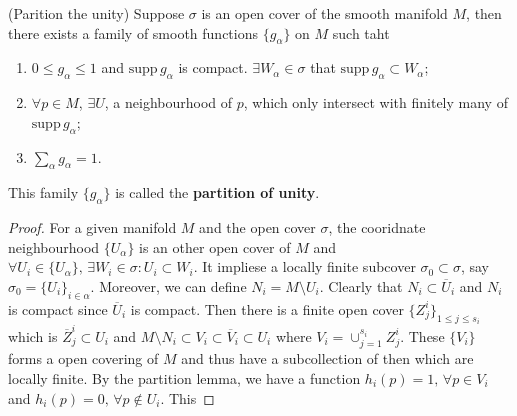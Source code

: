 \begin{theorem}(Parition the unity)
Suppose $\sigma$ is an open cover of the smooth manifold $M$, then there exists a family of smooth functions $\{g_\alpha\}$ on $M$ such taht
\begin{enumerate}
\item $0\le g_\alpha\le1$ and $\text{supp}\,g_\alpha$ is compact. $\exists W_\alpha\in\sigma$ that $\text{supp}\,g_\alpha\subset W_\alpha$;
\item $\forall p\in M$, $\exists U$, a neighbourhood of $p$, which only intersect with finitely many of $\text{supp}\,g_\alpha$;
\item $\sum_\alpha g_\alpha=1$.
\end{enumerate}
This family $\{g_\alpha\}$ is called the \textbf{partition of unity}.
\end{theorem}

\begin{proof}
For a given manifold $M$ and the open cover $\sigma$, the cooridnate neighbourhood $\{U_\alpha\}$ is an other open cover of $M$ and $\forall U_i\in\{U_\alpha\},\,\exists W_i\in\sigma: U_i\subset W_i$. It impliese a locally finite subcover $\sigma_0\subset\sigma$, say $\sigma_0=\{U_i\}_{i\in\alpha}$. Moreover, we can define $N_i=M\setminus U_i$. Clearly that $N_i\subset\overline{U}_i$ and $N_i$ is compact since $\overline{U}_i$ is compact. Then there is a finite open cover $\{Z_j^i\}_{1\le j\le s_i}$ which is $\overline{Z}_j^i\subset U_i$ and $M\setminus N_i\subset V_i\subset\overline{V}_i\subset U_i$ where $V_i=\cup_{j=1}^{s_i}Z_j^i$. These $\{V_i\}$ forms a open covering of $M$ and thus have a subcollection of then which are locally finite. By the partition lemma, we have a function $h_i(p)=1,\,\forall p\in V_i$ and $h_i(p)=0,\,\forall p\notin U_i$. This 
\end{proof}
